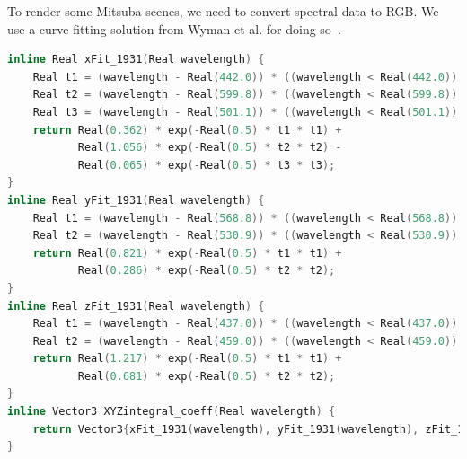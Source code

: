 \documentclass{article}
\begin{document}
To render some Mitsuba scenes, we need to convert spectral data to RGB. We use a curve fitting solution from Wyman et al. for doing so~\cite{Wyman:2013:SAP}.
\begin{lstlisting}[language=c++]
inline Real xFit_1931(Real wavelength) {
    Real t1 = (wavelength - Real(442.0)) * ((wavelength < Real(442.0)) ? Real(0.0624) : Real(0.0374));
    Real t2 = (wavelength - Real(599.8)) * ((wavelength < Real(599.8)) ? Real(0.0264) : Real(0.0323));
    Real t3 = (wavelength - Real(501.1)) * ((wavelength < Real(501.1)) ? Real(0.0490) : Real(0.0382));
    return Real(0.362) * exp(-Real(0.5) * t1 * t1) + 
           Real(1.056) * exp(-Real(0.5) * t2 * t2) -
           Real(0.065) * exp(-Real(0.5) * t3 * t3);
}
inline Real yFit_1931(Real wavelength) {
    Real t1 = (wavelength - Real(568.8)) * ((wavelength < Real(568.8)) ? Real(0.0213) : Real(0.0247));
    Real t2 = (wavelength - Real(530.9)) * ((wavelength < Real(530.9)) ? Real(0.0613) : Real(0.0322));
    return Real(0.821) * exp(-Real(0.5) * t1 * t1) +
           Real(0.286) * exp(-Real(0.5) * t2 * t2);
}
inline Real zFit_1931(Real wavelength) {
    Real t1 = (wavelength - Real(437.0)) * ((wavelength < Real(437.0)) ? Real(0.0845) : Real(0.0278));
    Real t2 = (wavelength - Real(459.0)) * ((wavelength < Real(459.0)) ? Real(0.0385) : Real(0.0725));
    return Real(1.217) * exp(-Real(0.5) * t1 * t1) +
           Real(0.681) * exp(-Real(0.5) * t2 * t2);
}
inline Vector3 XYZintegral_coeff(Real wavelength) {
    return Vector3{xFit_1931(wavelength), yFit_1931(wavelength), zFit_1931(wavelength)};
}


\end{lstlisting}
\end{document}
